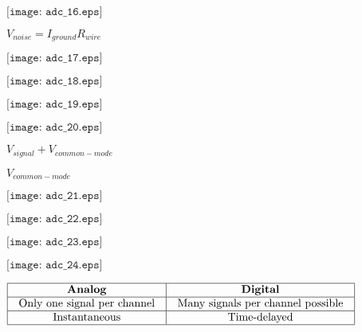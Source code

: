 \documentclass[12pt,a4paper,margin=2cm]{book}
\def\lthtmlcheckvsize{\ifdim\ht\sizebox<\vsize 
  \ifdim\wd\sizebox<\hsize\expandafter\hfill\fi \expandafter\vfill
  \else\expandafter\vss\fi}%
\begin{document}
{\newpage\clearpage
{}%
$\displaystyle \texttt{[image: adc\_16.eps]}$%
\lthtmlindisplaymathZ
\lthtmlcheckvsize\clearpage}

{\newpage\clearpage
{}%
$ V_{noise} = I_{ground} R_{wire}$%
\lthtmlindisplaymathZ
\lthtmlcheckvsize\clearpage}

{\newpage\clearpage
{}%
$\displaystyle \texttt{[image: adc\_17.eps]}$%
\lthtmlindisplaymathZ
\lthtmlcheckvsize\clearpage}

{\newpage\clearpage
{}%
$\displaystyle \texttt{[image: adc\_18.eps]}$%
\lthtmlindisplaymathZ
\lthtmlcheckvsize\clearpage}

{\newpage\clearpage
{}%
$\displaystyle \texttt{[image: adc\_19.eps]}$%
\lthtmlindisplaymathZ
\lthtmlcheckvsize\clearpage}

{\newpage\clearpage
{}%
$\displaystyle \texttt{[image: adc\_20.eps]}$%
\lthtmlindisplaymathZ
\lthtmlcheckvsize\clearpage}

{\newpage\clearpage
{}%
$ V_{signal} + V_{common-mode}$%
\lthtmlindisplaymathZ
\lthtmlcheckvsize\clearpage}

{\newpage\clearpage
{}%
$ V_{common-mode}$%
\lthtmlindisplaymathZ
\lthtmlcheckvsize\clearpage}

{\newpage\clearpage
{}%
$\displaystyle \texttt{[image: adc\_21.eps]}$%
\lthtmlindisplaymathZ
\lthtmlcheckvsize\clearpage}

{\newpage\clearpage
{}%
$\displaystyle \texttt{[image: adc\_22.eps]}$%
\lthtmlindisplaymathZ
\lthtmlcheckvsize\clearpage}

{\newpage\clearpage
{}%
$\displaystyle \texttt{[image: adc\_23.eps]}$%
\lthtmlindisplaymathZ
\lthtmlcheckvsize\clearpage}

{\newpage\clearpage
{}%
$\displaystyle \texttt{[image: adc\_24.eps]}$%
\lthtmlindisplaymathZ
\lthtmlcheckvsize\clearpage}

{\newpage\clearpage
{}%
$\displaystyle \vbox{\offinterlineskip
\halign{\strut
\vrule \quad\hfil # \  \hfil & 
\vrule \quad\hfil # \  \hfil \vrule \cr
\noalign{\hrule }
\textbf{Analog} & \textbf{Digital} \cr
\noalign{\hrule }
Only one signal per channel & Many signals per channel possible \cr
\noalign{\hrule }
Instantaneous & Time-delayed \cr
\noalign{\hrule }
} %
}$%
\lthtmlindisplaymathZ
\lthtmlcheckvsize\clearpage}
\end{document}
